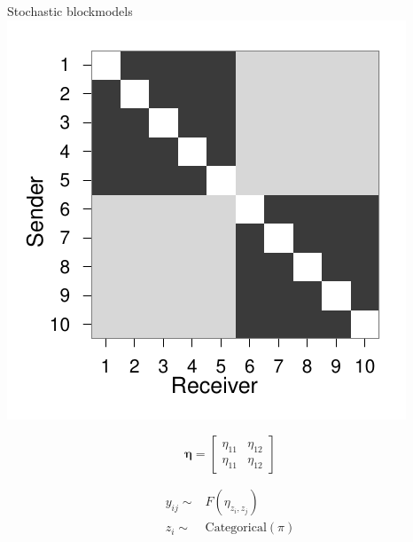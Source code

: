 \documentclass{beamer}
\begin{document}
\begin{frame}{Stochastic blockmodels}
\includegraphics[scale=.5]{../../figs/synthetic/bm}

$$\boldsymbol{\eta} = \left[
\begin {array}{cc}
 \eta_{11}& \eta_{12} \\
 \eta_{11}& \eta_{12} 
\end {array}
\right]$$


\begin{align*}
y_{ij} \sim& F(\eta_{z_i,z_j}) \\
z_i \sim& \mbox{Categorical}(\pi)
\end{align*}


\end{frame}
\end{document}
